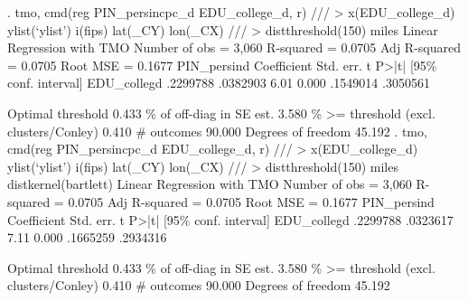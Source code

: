 . tmo, cmd(reg PIN_persincpc_d EDU_college_d, r) ///
>     x(EDU_college_d) ylist(`ylist') i(fips) lat(_CY) lon(_CX) ///
>     distthreshold(150) miles
{\smallskip}
Linear Regression with TMO                              Number of obs =  3,060
                                                        R-squared     = 0.0705
                                                        Adj R-squared = 0.0705
                                                        Root MSE      = 0.1677
{\smallskip}
PIN_persin{\tytilde}d {\VBAR} Coefficient  Std. err.      t    P>|t|     [95\% conf. interval]
EDU_colleg{\tytilde}d {\VBAR}   .2299788   .0382903     6.01   0.000     .1549014    .3050561
                                                                               
                                                   Optimal threshold      0.433
                                            \% of off-diag in SE est.      3.580
                              \% >= threshold (excl. clusters/Conley)      0.410
                                                          \# outcomes     90.000
                                                  Degrees of freedom     45.192
{\smallskip}
. tmo, cmd(reg PIN_persincpc_d EDU_college_d, r) ///
>     x(EDU_college_d) ylist(`ylist') i(fips) lat(_CY) lon(_CX) ///
>     distthreshold(150) miles distkernel(bartlett)
{\smallskip}
Linear Regression with TMO                              Number of obs =  3,060
                                                        R-squared     = 0.0705
                                                        Adj R-squared = 0.0705
                                                        Root MSE      = 0.1677
{\smallskip}
PIN_persin{\tytilde}d {\VBAR} Coefficient  Std. err.      t    P>|t|     [95\% conf. interval]
EDU_colleg{\tytilde}d {\VBAR}   .2299788   .0323617     7.11   0.000     .1665259    .2934316
                                                                               
                                                   Optimal threshold      0.433
                                            \% of off-diag in SE est.      3.580
                              \% >= threshold (excl. clusters/Conley)      0.410
                                                          \# outcomes     90.000
                                                  Degrees of freedom     45.192
